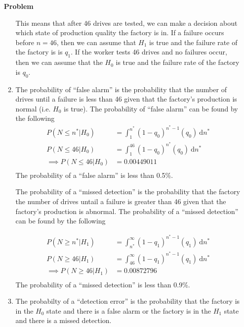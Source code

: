 \documentclass[12pt]{article}
\newenvironment{Ex}{\textbf{Problem}\vspace{.75em}\\}{}
\newcommand{\dd}[1]{\:\mathrm{d}{#1}}
\begin{document}
\begin{enumerate}
\begin{Ex}
\begin{solution}
\begin{enumerate}
        This means that after 46 drives are tested, we can make a
        decision about which state of production quality the factory
        is in. If a failure occurs before $n=46$, then we can assume
        that $H_1$ is true and the failure rate of the factory is is
        $q_1$. If the worker tests 46 drives and no failures occur,
        then we can assume that the $H_0$ is true and the failure rate
        of the factory is $q_0$.
      \item The probability of ``false alarm'' is the probability that
        the number of drives until a failure is less than 46 given
        that the factory's production is normal (i.e. $H_0$ is
        true). The probability of ``false alarm'' can be found by the
        following
        \begin{equation}
          \label{eq:1b-false-alarm}
          \begin{aligned}
            P(N\le n^*|H_0) &= \int_1^{n^*} (1-q_0)^{n^*-1}(q_0)\dd{n^*} \\
            P(N\le 46|H_0) &=\int_1^{46} (1-q_0)^{n^*}(q_0)\dd{n^*} \\
            \implies P(N\le 46|H_0) &= 0.00449011 \\
          \end{aligned}
        \end{equation}
        The probability of a ``false alarm'' is less than 0.5\%.

        The probability of a ``missed detection'' is the probability
        that the factory the number of drives untail a failure is
        greater than 46 given that the factory's production is
        abnormal. The probability of a ``missed detection'' can be
        found by the following

        \begin{equation}
          \label{eq:1b-missed-detection}
          \begin{aligned}
            P(N\ge n^*|H_1) &= \int_{n^*}^{\infty}
            (1-q_1)^{n^*-1}(q_1)\dd{n^*} \\
            P(N\ge 46|H_1) &= \int_{46}^{\infty}
            (1-q_1)^{n^*-1}(q_1)\dd{n^*} \\
            \implies P(N\ge 46|H_1) &= 0.00872796 \\
          \end{aligned}
        \end{equation}
        The probability of a ``missed detection'' is less than 0.9\%.
      \item The probabilty of a ``detection error'' is the probability
        that the factory is in the $H_0$ state and there is a false
        alarm or the factory is in the $H_1$ state and there is a
        missed detection.


\end{enumerate}
\end{solution}
\end{Ex}
\end{enumerate}
\end{document}
